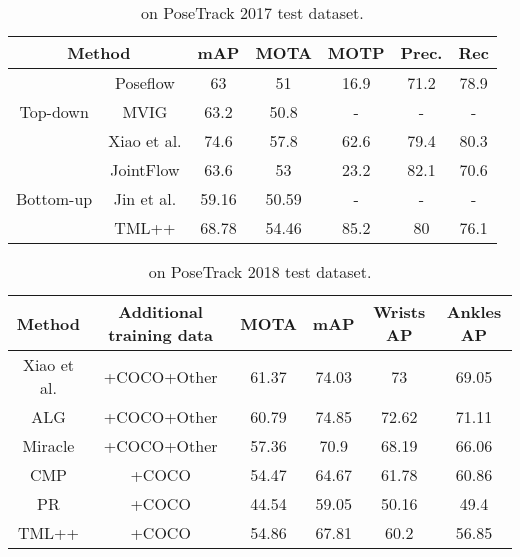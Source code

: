 \documentclass[conference]{IEEEtran}
\begin{document}
\begin{table}[t!]
  \centering

    \caption{ on PoseTrack 2017 test dataset.}
  \begin{adjustbox}{width=1\linewidth}

  \centering
     \begin{tabular}{r|c|c|c|c|c|c}
    \toprule
    \multicolumn{2}{c|}{Method} & mAP   & MOTA  & MOTP  & Prec. & Rec \\
    \midrule
    \midrule
    \multicolumn{1}{c|}{\multirow{3}[6]{*}{Top-down}} & Poseflow\cite{xiu2018pose} & 63    & 51    & 16.9  & 71.2  & 78.9 \\
\cmidrule{2-7}          & MVIG  & 63.2  & 50.8  & -     & -     & - \\
\cmidrule{2-7}          & Xiao et al.\cite{xiao2018simple} & 74.6  & 57.8  & 62.6  & 79.4  & 80.3 \\
    \midrule
          & JointFlow\cite{doering2018joint} & 63.6  & 53    & 23.2  & 82.1  & 70.6 \\
\cmidrule{2-7}    \multicolumn{1}{p{5.125em}|}{Bottom-up} & Jin et al.\cite{jin2017towards} & 59.16 & 50.59 & -     & -     & - \\
\cmidrule{2-7}          & TML++  & 68.78 & 54.46 & 85.2  & 80    & 76.1 \\
    \bottomrule
    \end{tabular}\end{adjustbox}

  \label{tab:comp_other}\end{table}



\begin{table}[t!]
  \centering
  \caption{ on PoseTrack 2018 test dataset.}
    \begin{adjustbox}{width=1\linewidth}

    \begin{tabular}[width=\linewidth]{c|c|c|c|c|c}
    \toprule
    Method & Additional training data & MOTA  & mAP   & Wrists AP & Ankles AP \\
    \midrule
    \midrule
    Xiao et al. \cite{xiao2018simple} & +COCO+Other      & 61.37 & 74.03 & 73    & 69.05 \\
    \midrule
    ALG   & +COCO+Other      & 60.79 & 74.85 & 72.62 & 71.11 \\
    \midrule
    Miracle & +COCO+Other      & 57.36 & 70.9  & 68.19 & 66.06 \\
    \midrule
    CMP   & +COCO       & 54.47 & 64.67 & 61.78 & 60.86 \\
    \midrule
    PR    & +COCO       & 44.54 & 59.05 & 50.16 & 49.4 \\
    \midrule
    TML++  & +COCO       & 54.86 & 67.81 & 60.2  & 56.85 \\
    \bottomrule
    \end{tabular}\end{adjustbox}
  \label{tab:comp_other2018}\end{table}
\end{document}
